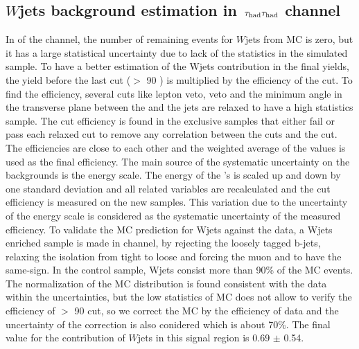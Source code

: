 \subsection{\texorpdfstring{$W$jets background estimation in $\,\tau_{\rm had}\tau_{\rm had}$ channel}{Wjets background estimation in tau-tau channel}}
In \binone of the \tauTau channel, the number of remaining events for $W$jets from MC is zero, but it has a large statistical uncertainty due to 
lack of the statistics in the simulated sample. 
To have a better estimation of the Wjets contribution in the final yields,
the yield before the last cut (\mttwo $>$ 90 \GeV) is multiplied by the efficiency of the cut. To find the efficiency, several cuts like 
lepton veto, \Z veto and the minimum angle in the transverse plane between the \MET and the jets 
are relaxed to have a high statistics sample. The cut efficiency is found in the exclusive samples that either fail or pass each relaxed cut
to remove any correlation between the cuts and the \mttwo cut.
The efficiencies are close to each other and the weighted average of the values is used as the final efficiency.
The main source of the systematic uncertainty on the backgrounds 
is the \Tau energy scale. The energy of the \Tau's is scaled up and down by one standard deviation and all related variables are 
recalculated and the cut efficiency is measured on the new samples. 
This variation due to the uncertainty of the \Tau energy scale is considered as the systematic uncertainty of the measured efficiency.
To validate the MC prediction for Wjets against the data, a Wjets enriched sample is made in \muTau channel, 
by rejecting the loosely tagged b-jets, relaxing the \Tau isolation from tight to loose and forcing the muon and \Tau to have the same-sign. 
In the control sample, Wjets consist more than 90\% of the MC events. The normalization of the MC distribution  is found consistent
with the data within the uncertainties, but the low statistics of MC does not allow to verify the efficiency of \mttwo $>$ 90 \GeV cut, 
so we correct the MC by the efficiency of data and the uncertainty of the correction is also conidered which is about 70\%. 
The final value for the contribution of $W$jets in this signal region is 0.69 $\pm$ 0.54.


